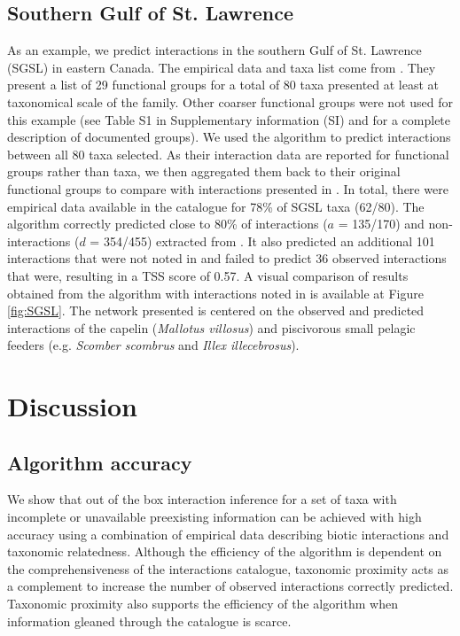     \subsection{Southern Gulf of St. Lawrence}
As an example, we predict interactions in the southern Gulf of St. Lawrence (SGSL) in eastern Canada. The empirical data and taxa list come from \citet{savenkoff2004}. They present a list of 29 functional groups for a total of 80 taxa presented at least at taxonomical scale of the family. Other coarser functional groups were not used for this example (see Table S1 in Supplementary information (SI) and \citet{savenkoff2004} for a complete description of documented groups).
We used the algorithm to predict interactions between all 80 taxa selected. As their interaction data are reported for functional groups rather than taxa, we then aggregated them back to their original functional groups to compare with interactions presented in \citet{savenkoff2004}. In total, there were empirical data available in the catalogue for 78\% of SGSL taxa (62/80). The algorithm correctly predicted close to 80\% of interactions ($a$ = 135/170) and non-interactions ($d$ = 354/455) extracted from \citet{savenkoff2004}. It also predicted an additional 101 interactions that were not noted in \citet{savenkoff2004} and failed to predict 36 observed interactions that were, resulting in a TSS score of 0.57. A visual comparison of results obtained from the algorithm with interactions noted in \citet{savenkoff2004} is available at Figure \ref{fig:SGSL}. The network presented is centered on the observed and predicted interactions of the capelin (\textit{Mallotus villosus}) and piscivorous small pelagic feeders (e.g. \textit{Scomber scombrus} and \textit{Illex illecebrosus}).


\section{Discussion}
\subsection{Algorithm accuracy}
We show that out of the box interaction inference for a set of taxa with incomplete or unavailable preexisting information can be achieved with high accuracy using a combination of empirical data describing biotic interactions and taxonomic relatedness. Although the efficiency of the algorithm is dependent on the comprehensiveness of the interactions catalogue, taxonomic proximity acts as a complement to increase the number of observed interactions correctly predicted. Taxonomic proximity also supports the efficiency of the algorithm when information gleaned through the catalogue is scarce.

